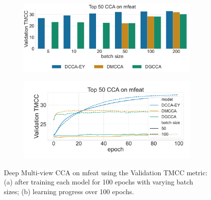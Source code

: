 \begin{figure}
     \centering
     \begin{subfigure}[b]{0.49\textwidth}
         \centering
         \includegraphics[width=\textwidth]{figures/DMCCA/mfeat_models_different_batch_sizes}
         \caption{}\label{fig:dmcca_corr}
     \end{subfigure}
     \hfill
     \begin{subfigure}[b]{0.49\textwidth}
         \centering
         \includegraphics[width=\textwidth]{figures/DMCCA/mfeat_allbatchsizes_pcc}
         \caption{}\label{fig:dmcca_lr}
     \end{subfigure}
     \caption{Deep Multi-view CCA on mfeat using the Validation TMCC metric: (a) after training each model for 100 epochs with varying batch sizes; (b) learning progress over 100 epochs.}
     \label{fig:dmcca}
\end{figure}


